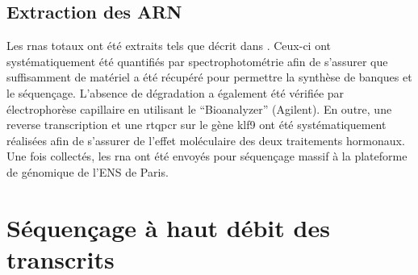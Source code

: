\documentclass[../main.tex]{subfiles}
\begin{document}
\subsection{Extraction des ARN}

Les \glspl{rna} totaux ont été extraits tels que décrit dans \citet{Bilesimo2011}.
Ceux-ci ont systématiquement été quantifiés par spectrophotométrie afin de s'assurer que suffisamment de matériel a été récupéré pour permettre la synthèse de banques et le séquençage.
L'absence de dégradation a également été vérifiée par électrophorèse capillaire en utilisant le ``Bioanalyzer'' (Agilent).
En outre, une reverse transcription et une \gls{rtqpcr} sur le gène \gls{klf9} ont été systématiquement réalisées afin de s'assurer de l'effet moléculaire des deux traitements hormonaux.
Une fois collectés, les \gls{rna} ont été envoyés pour séquençage massif à la plateforme de génomique de l'ENS de Paris.




\section{Séquençage à haut débit des transcrits}
\end{document}
